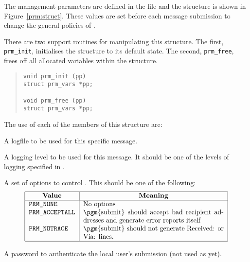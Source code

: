 The management parameters are defined in the file  and the
structure is shown in Figure~\ref{prm:struct}. These values are set
before each message submission to change the general policies of
.

There are two support routines for manipulating this structure. The
first, \verb|prm_init|, initialises the structure to its default
state. The second, \verb|prm_free|, frees off all allocated variables
within the structure.
\begin{quote}\small{}\begin{verbatim}
void prm_init (pp)
struct prm_vars *pp;

void prm_free (pp)
struct prm_vars *pp;
\end{verbatim}\end{quote}



The use of each of the members of this structure are:
\begin{describe}

\item[\verb|prm\_logfile|:] A logfile to be used for this specific message.

\item[\verb|prm\_loglevel|:]	A logging level to be used for this message.
It should be one of the levels of logging specified in .

\item[\verb|prm\_opts|:]	A set of options to control .
This should be one of the following:
\[\begin{tabular}{|l|p{0.6\textwidth}|}
\hline
	\multicolumn{1}{|c|}{\bf Value}&
		\multicolumn{1}{|c|}{\bf Meaning}\\
\hline
	\tt PRM\_NONE&	No options\\
	\tt PRM\_ACCEPTALL&
		\pgm{submit} should accept bad recipient addresses
			and generate error reports itself\\
	\tt PRM\_NOTRACE &
		\pgm{submit} should not generate Received: or Via:
			lines. \\
\hline
\end{tabular}\]

\item[\verb|prm\_passwd|:]	A password to authenticate the local
user's submission (not used as yet).
\end{describe}

